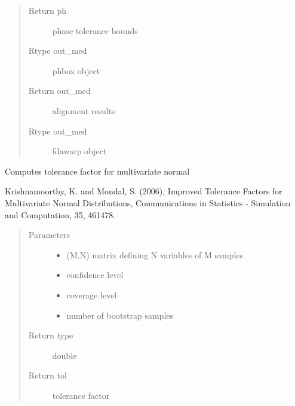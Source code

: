 \documentclass[letterpaper,10pt,english]{sphinxmanual}
\begin{document}
\begin{fulllineitems}
\begin{quote}
\begin{description}
\item[{Return ph}] \leavevmode
phase tolerance bounds

\item[{Rtype out\_med}] \leavevmode
phbox object

\item[{Return out\_med}] \leavevmode
alignment results

\item[{Rtype out\_med}] \leavevmode
fdawarp object

\end{description}\end{quote}

\end{fulllineitems}


\begin{fulllineitems}
\label{\detokenize{tolerance:tolerance.mvtol_region}}
Computes tolerance factor for multivariate normal

Krishnamoorthy, K. and Mondal, S. (2006), Improved Tolerance Factors for Multivariate Normal
Distributions, Communications in Statistics - Simulation and Computation, 35, 461\textendash{}478.
\begin{quote}\begin{description}
\item[{Parameters}] \leavevmode\begin{itemize}
\item {} 
 \textendash{} (M,N) matrix defining N variables of M samples

\item {} 
 \textendash{} confidence level

\item {} 
 \textendash{} coverage level

\item {} 
 \textendash{} number of bootstrap samples

\end{itemize}

\item[{Return type}] \leavevmode
double

\item[{Return tol}] \leavevmode
tolerance factor

\end{description}\end{quote}

\end{fulllineitems}
\end{document}

